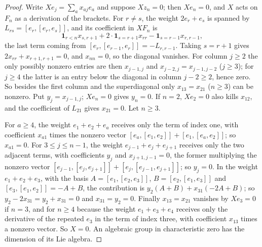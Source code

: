 \begin{proof}
Write $Xe_j=\sum_ax_{aj}e_a$ and suppose $Xz_n=0$; then $Xe_n=0$, and $X$ acts
on $F_n$ as a derivation of the brackets. For $r\ne s$, the weight $2e_r+e_s$
is spanned by $L_{rs}=[e_r,[e_r,e_s]]$, and its coefficient in $XF_n$ is
\[
 \mathbf1_{r<n}x_{s,r+1}+2\cdot\mathbf1_{s=r+1}x_{rr}-\mathbf1_{s=r-1}x_{r,r-1},
\]
the last term coming from $[e_r,[e_{r-1},e_r]]=-L_{r,r-1}$. Taking $s=r+1$ gives
$2x_{rr}+x_{r+1,r+1}=0$, and $x_{nn}=0$, so the diagonal vanishes. For column
$j\ge2$ the only possibly nonzero entries are then $x_{j-1,j}$ and
$x_{j-2,j}=x_{j-1,j-2}$ ($j\ge3$); for $j\ge4$ the latter is an entry below the
diagonal in column $j-2\ge2$, hence zero. So besides the first column and the
superdiagonal only $x_{13}=x_{21}$ ($n\ge3$) can be nonzero. Put
$y_j=x_{j-1,j}$; $Xe_n=0$ gives $y_n=0$. If $n=2$, $Xe_2=0$ also kills $x_{12}$,
and the coefficient of $L_{21}$ gives $x_{21}=0$. Let $n\ge3$.

For $a\ge4$, the weight $e_1+e_2+e_a$ receives only the term of index one,
with coefficient $x_{a1}$ times the nonzero vector
$[e_a,[e_1,e_2]]+[e_1,[e_a,e_2]]$; so $x_{a1}=0$. For $3\le j\le n-1$, the
weight $e_{j-1}+e_j+e_{j+1}$ receives only the two adjacent terms, with
coefficients $y_j$ and $x_{j+1,j-1}=0$, the former multiplying the nonzero
vector $[e_{j-1},[e_j,e_{j+1}]]+[e_j,[e_{j-1},e_{j+1}]]$; so $y_j=0$. In the
weight $e_1+e_2+e_3$, with the basis $A=[e_1,[e_2,e_3]]$,
$B=[e_2,[e_1,e_3]]$ and $[e_3,[e_1,e_2]]=-A+B$, the contribution is
$y_2(A+B)+x_{31}(-2A+B)$; so $y_2-2x_{31}=y_2+x_{31}=0$ and
$x_{31}=y_2=0$. Finally $x_{13}=x_{21}$ vanishes by $Xe_3=0$ if $n=3$, and for
$n\ge4$ because the weight $e_1+e_3+e_4$ receives only the derivative of the
repeated $e_3$ in the term of index three, with coefficient $x_{13}$ times a
nonzero vector. So $X=0$. An algebraic group in characteristic zero has the
dimension of its Lie algebra.
\end{proof}

